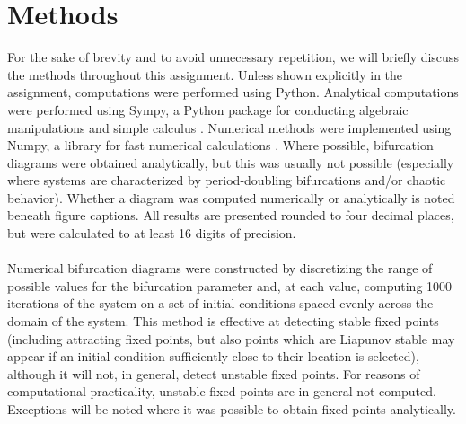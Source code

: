 \documentclass{article}
\begin{document}
\section*{Methods}
For the sake of brevity and to avoid unnecessary repetition, we will briefly discuss the methods 
throughout this assignment. Unless shown explicitly in the assignment, computations were performed 
using Python. Analytical computations were performed using Sympy, a Python package for conducting 
algebraic manipulations and simple calculus \cite{sympy}. Numerical methods were implemented using 
Numpy, a library for fast numerical calculations \cite{numpy}. Where possible, bifurcation 
diagrams were obtained analytically, but this was usually not possible (especially where systems are 
characterized by period-doubling bifurcations and/or chaotic behavior). Whether a diagram was 
computed numerically or analytically is noted beneath figure captions. All results are presented 
rounded to four decimal places, but were calculated to at least 16 digits of precision.

\paragraph{}
Numerical bifurcation diagrams were constructed by discretizing the range of possible values for 
the bifurcation parameter and, at each value, computing 1000 iterations of the system on a set of 
initial conditions spaced evenly across the domain of the system. This method is effective at 
detecting stable fixed points (including attracting fixed points, but also points which are Liapunov 
stable may appear if an initial condition sufficiently close to their location is selected), although it will not, in general, detect unstable fixed points. 
For reasons of computational practicality, unstable fixed points are in general not computed. 
Exceptions will be noted where it was possible to obtain fixed points analytically.

\printbibliography
\end{document}
